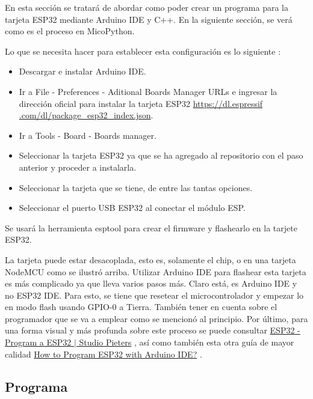\documentclass[conference]{IEEEtran}
\begin{document}
En esta sección se tratará de abordar como poder crear un programa para la
tarjeta ESP32 mediante Arduino IDE y C++. En la siguiente sección, se verá
como es el proceso en MicoPython.

\bigbreak

Lo que se necesita hacer para establecer esta configuración es lo siguiente
\cite{pieters-2022}:

\begin{itemize}
\item Descargar e instalar Arduino IDE.

\item Ir a File - Preferences - Aditional Boards Manager URLs e ingresar la
dirección oficial para instalar la tarjeta ESP32 \url{https://dl.espressif
    .com/dl/package_esp32_index.json}.

\item Ir a Tools - Board - Boards manager.

\item Seleccionar la tarjeta ESP32 ya que se ha agregado al repositorio con
el paso anterior y proceder a instalarla.

\item Seleccionar la tarjeta que se tiene, de entre las tantas opciones.

\item Seleccionar el puerto USB ESP32 al conectar el módulo ESP.
\end{itemize}

Se usará la herramienta esptool para crear el firmware y flashearlo en la
tarjete ESP32.

\bigbreak

La tarjeta puede estar desacoplada, esto es, solamente el chip, o en una
tarjeta NodeMCU como se ilustró arriba. Utilizar Arduino IDE para flashear
esta tarjeta es más complicado ya que lleva varios pasos más. Claro está, es
Arduino IDE y no ESP32 IDE. Para esto, se tiene que resetear el
microcontrolador y empezar lo en modo flash usando GPIO-0 a Tierra. También
tener en cuenta sobre el programador que se va a emplear como se mencionó al
principio. Por último, para una forma visual y más profunda sobre este
proceso se puede consultar
\href{https://www.studiopieters.nl/esp32-program-a-esp32}{ESP32 - Program a ESP32 $\mid$ Studio Pieters}
\cite{pieters-2022}, así como también esta otra guía de mayor calidad
\href{https://www.electronicshub.org/esp32-arduino-ide}{How to Program ESP32 with Arduino IDE?} \cite{teja-2021}.

\subsection{Programa}
\end{document}

